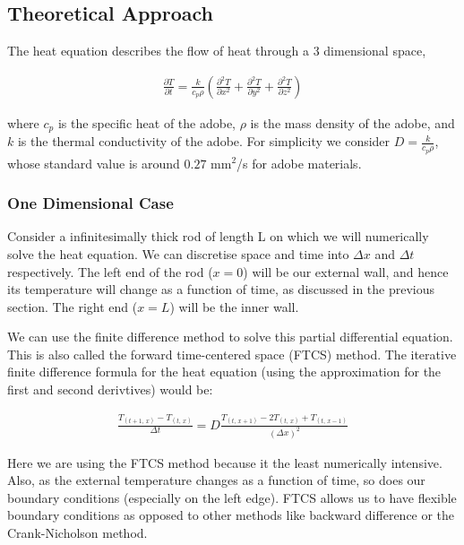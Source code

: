 
\subsection{Theoretical Approach}
The heat equation describes the flow of heat through a 3 dimensional space,

\begin{align}
    \frac{\partial T}{\partial t} = \frac{k}{c_p\rho}\left(\frac{\partial^2 T}{\partial x^2} + \frac{\partial^2 T}{\partial y^2} + \frac{\partial^2 T}{\partial z^2}\right)
\end{align}

where $c_p$ is the specific heat of the adobe, $\rho$ is the mass density of the adobe, and $k$ is the thermal conductivity of the adobe. For simplicity we consider $D=\frac{k}{c_p\rho}$, whose standard value is around $0.27$ mm$^2$/s for adobe materials. 

\subsubsection{One Dimensional Case}
Consider a infinitesimally thick rod of length L on which we will numerically solve the heat equation. We can discretise space and time into $\Delta x$ and $\Delta t$ respectively. The left end of the rod ($x=0$) will be our external wall, and hence its temperature will change as a function of time, as discussed in the previous section. The right end ($x=L$) will be the inner wall.

We can use the finite difference method to solve this partial differential equation. This is also called the forward time-centered space (FTCS) method. The iterative finite difference formula for the heat equation (using the approximation for the first and second derivtives) would be:

\begin{align}
   \frac{T_{(t+1,\,x)}-T_{(t,\,x)}}{\Delta t} = D\frac{T_{(t,\,x+1)}-2T_{(t,\,x)}+T_{(t,\,x-1)}}{(\Delta x)^2}
\end{align}

Here we are using the FTCS method because it the least numerically intensive. Also, as the external temperature changes as a function of time, so does our boundary conditions (especially on the left edge). FTCS allows us to have flexible boundary conditions as opposed to other methods like backward difference or the Crank-Nicholson method. 

